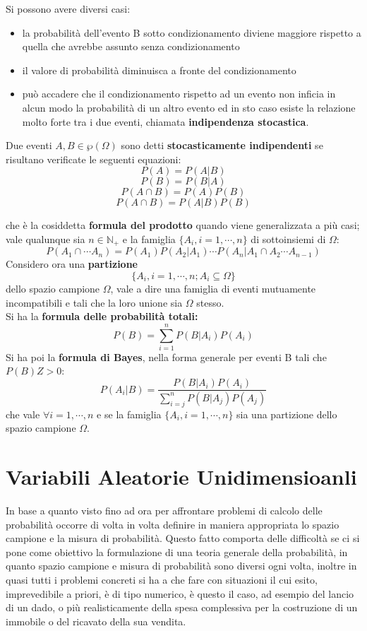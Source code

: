 \documentclass[a4paper,12pt, oneside]{book}
\begin{document}
Si possono avere diversi casi:
\begin{itemize}
    \item la probabilità dell’evento B sotto condizionamento diviene maggiore rispetto a quella che avrebbe assunto senza condizionamento
    \item il valore di probabilità diminuisca a fronte del condizionamento
    \item può accadere che il condizionamento rispetto ad un evento non inficia in alcun modo la probabilità di 
          un altro evento ed in sto caso esiste la relazione molto forte tra i due eventi, chiamata \textbf{indipendenza stocastica}.
\end{itemize}
\begin{definizione}
Due eventi $A, B \in \wp(\Omega)$ sono detti \textbf{stocasticamente indipendenti} se risultano verificate le seguenti equazioni:
\[P(A) = P(A|B) \]
\[P(B) = P(B | A)\]
\[P(A \cap B) = P(A) P(B) \]
\[P(A \cap B) = P(A | B) P(B) \]
\end{definizione}
che è la cosiddetta \textbf{formula del prodotto} quando viene generalizzata a più casi; vale qualunque sia $n\in \mathbb{N}_+$ e la famiglia $\{A_i,i=1,\cdots, n\}$ di sottoinsiemi di $\Omega$:
\[P(A_1\cap\cdots A_n)=P(A_1)P(A_2|A_1)\cdots P(A_n|A_1\cap A_2\cdots A_{n-1})\]
Considero ora una \textbf{partizione} 
\[\{A_i, i=1,\cdots,n;A_i\subseteq \Omega\}\]
dello spazio campione $\Omega$, vale a dire una famiglia di eventi mutuamente incompatibili e
tali che la loro unione sia $\Omega$ stesso. \\
Si ha la \textbf{formula delle probabilità totali:}
\[P(B)=\sum_{i=1}^n P(B|A_i)P(A_i)\]
Si ha poi la \textbf{formula di Bayes}, nella forma generale per eventi B tali che $P(B)Z>0$:
\[P(A_i|B)=\frac{P(B|A_i)P(A_i)}{\sum_{i=j}^n P(B|A_j)P(A_j)}\]
che vale $\forall i=1,\cdots, n$ e se la famiglia $\{A_i,i=1,\cdots, n\}$ sia una partizione dello spazio campione $\Omega$.

\section{Variabili Aleatorie Unidimensioanli}
In base a quanto visto fino ad ora per affrontare problemi di calcolo delle probabilità occorre di volta
in volta definire in maniera appropriata lo spazio campione e la misura di probabilità.\newline
Questo fatto comporta delle difficoltà se ci si pone come obiettivo la formulazione di una teoria
generale della probabilità, in quanto spazio campione e misura di probabilità sono diversi ogni volta,
inoltre in quasi tutti i problemi concreti si ha a che fare con situazioni il cui esito, imprevedibile a
priori, è di tipo numerico, è questo il caso, ad esempio del lancio di un dado, o più realisticamente
della spesa complessiva per la costruzione di un immobile o del ricavato della sua vendita.
\end{document}
